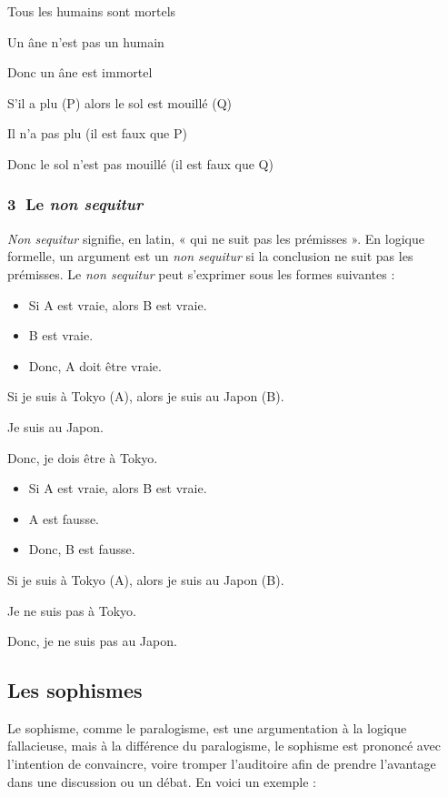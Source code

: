 Tous les humains sont mortels

Un âne n’est pas un humain

Donc un âne est immortel

S’il a plu (P) alors le sol est mouillé (Q)

Il n’a pas plu (il est faux que P)

Donc le sol n’est pas mouillé (il est faux que Q)

\subsubsection*{\textcircled{\scriptsize 3} Le \textit{non sequitur}}
\textit{Non sequitur} signifie, en latin, « qui ne suit pas les prémisses ». En logique formelle, un argument est un \textit{non sequitur} si la conclusion ne suit pas les prémisses. Le \textit{non sequitur} peut s’exprimer sous les formes suivantes :
\begin{itemize}[label=--]
\item Si A est vraie, alors B est vraie.
\item B est vraie.
\item Donc, A doit être vraie.
\end{itemize}
Si je suis à Tokyo (A), alors je suis au Japon (B).

Je suis au Japon.

Donc, je dois être à Tokyo.

\begin{itemize}[label=--]
\item Si A est vraie, alors B est vraie.
\item A est fausse.
\item Donc, B est fausse.
\end{itemize}

Si je suis à Tokyo (A), alors je suis au Japon (B).

Je ne suis pas à Tokyo.

Donc, je ne suis pas au Japon.

\subsection{Les sophismes}
Le sophisme, comme le paralogisme, est une argumentation à la logique fallacieuse, mais à la différence du paralogisme, le sophisme est prononcé avec l’intention de convaincre, voire tromper l’auditoire afin de prendre l’avantage dans une discussion ou un débat. En voici un exemple :

